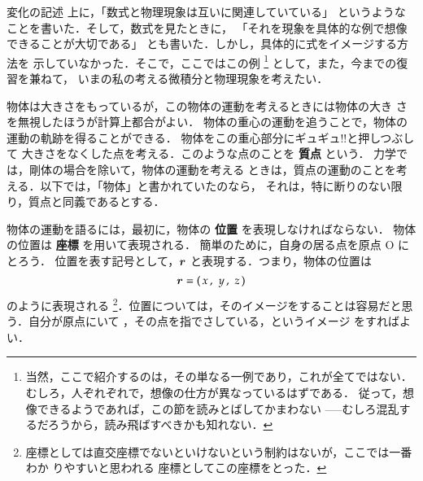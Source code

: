             \begin{memo}{変化の記述}
                上に，「数式と物理現象は互いに関連していている」
                というようなことを書いた．そして，数式を見たときに，
                「それを現象を具体的な例で想像できることが大切である」
                とも書いた．しかし，具体的に式をイメージする方法を
                示していなかった．そこで，ここではこの例
                    \footnote{
                        当然，ここで紹介するのは，その単なる一例であり，これが全てではない．
                        むしろ，人ぞれぞれで，想像の仕方が異なっているはずである．
                        従って，想像できるようであれば，この節を読みとばしてかまわない
                        -----むしろ混乱するだろうから，読み飛ばすべきかも知れない．
                    }
                として，また，今までの復習を兼ねて，
                いまの私の考える微積分と物理現象を考えたい．


                物体は大きさをもっているが，この物体の運動を考えるときには物体の大き
                さを無視したほうが計算上都合がよい．
                物体の重心の運動を追うことで，物体の運動の軌跡を得ることができる．
                物体をこの重心部分にギュギュ!!と押しつぶして
                大きさをなくした点を考える．このような点のことを \textbf{質点} という．
                力学では，剛体の場合を除いて，物体の運動を考える
                ときは，質点の運動のことを考える．以下では，「物体」と書かれていたのなら，
                それは，特に断りのない限り，質点と同義であるとする．

                物体の運動を語るには，最初に，物体の \textbf{位置} を表現しなければならない．
                物体の位置は \textbf{座標} を用いて表現される．
                簡単のために，自身の居る点を原点 O にとろう．
                位置を表す記号として，$\boldsymbol{r}$ と表現する．つまり，物体の位置は
                \begin{equation*}
                \boldsymbol{r} =(\,x\,,\,\,y\,,\,\,z\,)
                \end{equation*}
                のように表現される
                \footnote{
                座標としては直交座標でないといけないという制約はないが，ここでは一番わか
                りやすいと思われる
                座標としてこの座標をとった．
                }．位置については，そのイメージをすることは容易だと思う．自分が原点にいて
                ，その点を指でさしている，というイメージ
                をすればよい．


\end{memo}
